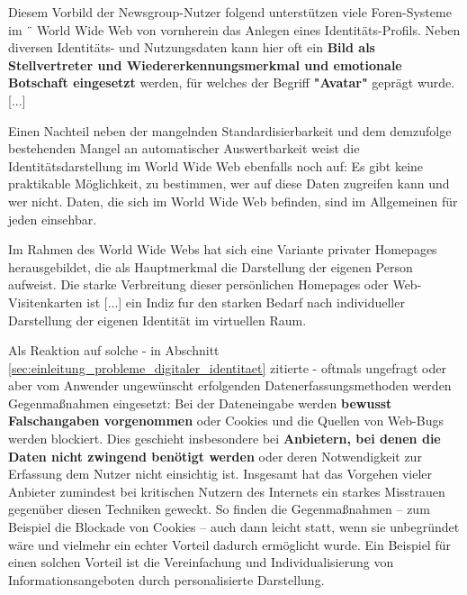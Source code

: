 \vspace{0.3cm}


\begin{Zitat}[Avatar]

Diesem Vorbild der Newsgroup-Nutzer folgend unterstützen viele Foren-Systeme im ¨
World Wide Web von vornherein das Anlegen eines Identitäts-Profils. Neben diversen
Identitäts- und Nutzungsdaten kann hier oft ein \textbf{Bild als Stellvertreter und Wiedererkennungsmerkmal und emotionale Botschaft eingesetzt} werden, für welches der Begriff \textbf{"Avatar"} geprägt wurde. [...]

Einen Nachteil neben der mangelnden
Standardisierbarkeit und dem demzufolge bestehenden Mangel an automatischer Auswertbarkeit weist die Identitätsdarstellung im World Wide Web ebenfalls noch auf: Es
gibt keine praktikable Möglichkeit, zu bestimmen, wer auf diese Daten zugreifen kann
und wer nicht. Daten, die sich im World Wide Web befinden, sind im Allgemeinen für jeden einsehbar. 

\end{Zitat}

\vspace{0.3cm}


\begin{Zitat}

Im Rahmen des World Wide Webs hat sich eine Variante privater Homepages herausgebildet, die als Hauptmerkmal die Darstellung der eigenen Person aufweist. Die
starke Verbreitung dieser persönlichen Homepages oder Web-Visitenkarten ist [...] ein Indiz fur den starken Bedarf nach individueller Darstellung der eigenen Identität im virtuellen Raum.

\end{Zitat}

\vspace{0.3cm}


\begin{Zitat}

Als Reaktion auf solche - in Abschnitt \ref{sec:einleitung_probleme_digitaler_identitaet} zitierte - oftmals ungefragt oder aber vom Anwender ungewünscht erfolgenden Datenerfassungsmethoden werden Gegenmaßnahmen eingesetzt: Bei der Dateneingabe werden \textbf{bewusst Falschangaben vorgenommen} oder Cookies und die Quellen von Web-Bugs werden blockiert. Dies geschieht insbesondere bei \textbf{Anbietern, bei denen die Daten nicht zwingend benötigt werden} oder deren Notwendigkeit zur Erfassung dem Nutzer nicht einsichtig ist. Insgesamt hat das Vorgehen vieler Anbieter zumindest bei kritischen Nutzern des Internets ein starkes Misstrauen gegenüber diesen Techniken geweckt. So finden die Gegenmaßnahmen – zum Beispiel die Blockade von Cookies – auch dann leicht statt, wenn sie unbegründet wäre und vielmehr ein echter Vorteil dadurch
ermöglicht wurde. Ein Beispiel für einen solchen Vorteil ist die Vereinfachung und Individualisierung von Informationsangeboten durch personalisierte Darstellung.

\end{Zitat}

